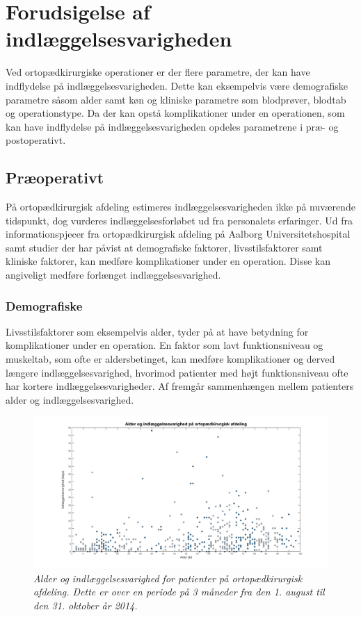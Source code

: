 \section{Forudsigelse af indlæggelsesvarigheden}
Ved ortopædkirurgiske operationer er der flere parametre, der kan have indflydelse på indlæggelsesvarigheden. Dette kan eksempelvis være demografiske parametre såsom alder samt køn og kliniske parametre som blodprøver, blodtab og operationstype. Da der kan opstå komplikationer under en operationen, som kan have indflydelse på indlæggelsesvarigheden opdeles parametrene i præ- og postoperativt.


\subsection{Præoperativt}
På ortopædkirurgisk afdeling estimeres indlæggelsesvarigheden ikke på nuværende tidspunkt, dog vurderes indlæggelsesforløbet ud fra personalets erfaringer. Ud fra informationspjecer fra ortopædkirurgisk afdeling på Aalborg Universitetshospital samt studier der har påvist at demografiske faktorer, livsstilsfaktorer samt kliniske faktorer, kan medføre komplikationer under en operation. Disse kan angiveligt medføre forlænget indlæggelsesvarighed. 


\subsubsection{Demografiske}
Livsstilsfaktorer som eksempelvis alder, tyder på at have betydning for komplikationer under en operation. En faktor som lavt funktionsniveau og muskeltab, som ofte er aldersbetinget, kan medføre komplikationer og derved længere indlæggelsesvarighed, hvorimod patienter med højt funktionsniveau ofte har kortere indlæggelsesvarigheder.\cite{Kehlet2001, Janssen2002} Af  fremgår sammenhængen mellem patienters alder og indlæggelsesvarighed. 


\begin{figure}[H]
	\centering
	\includegraphics[scale=0.3]{figures/alderogindlaeg}
	\caption{\textit{Alder og indlæggelsesvarighed for patienter på ortopædkirurgisk afdeling. Dette er over en periode på 3 måneder fra den 1. august til den 31. oktober år 2014.}}
	\label{alderogindlaeggelse}
\end{figure}


